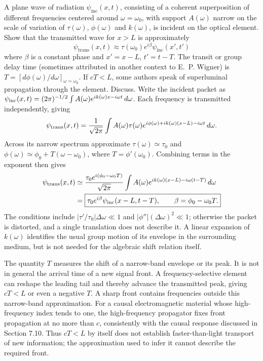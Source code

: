 A plane wave of radiation $\psi_{\mathrm{inc}}(x,t)$, consisting of a coherent superposition of different frequencies centered around $\omega=\omega_{0}$, with support $A(\omega)$ narrow on the scale of variation of $\tau(\omega)$, $\phi(\omega)$ and $k(\omega)$, is incident on the optical element. Show that the transmitted wave for $x>L$ is approximately
\[
\psi_{\mathrm{trans}}(x,t)\approx\tau(\omega_{0})e^{i\beta}\psi_{\mathrm{inc}}(x',t')
\]
where $\beta$ is a constant phase and $x'=x-L$, $t'=t-T$. The transit or group delay time (sometimes attributed in another context to E.~P. Wigner) is $T=[d\phi(\omega)/d\omega]_{\omega=\omega_{0}}$. If $cT<L$, some authors speak of superluminal propagation through the element. Discuss.
\solution
Write the incident packet as
$\psi_{\rm inc}(x,t)=(2\pi)^{-1/2}\int A(\omega)e^{ik(\omega)x-i\omega t}\,d\omega$.
Each frequency is transmitted independently, giving
\[
\psi_{\rm trans}(x,t)=\frac1{\sqrt{2\pi}}\int A(\omega)\tau(\omega)
 e^{i\phi(\omega)+ik(\omega)(x-L)-i\omega t}\,d\omega.
\]
Across its narrow spectrum approximate $\tau(\omega)\simeq\tau_0$
and $\phi(\omega)\simeq\phi_0+T(\omega-\omega_0)$, where
$T=\phi'(\omega_0)$. Combining terms in the exponent then gives
\begin{align*}
\psi_{\rm trans}(x,t)
&\simeq\frac{\tau_0 e^{i(\phi_0-\omega_0T)}}{\sqrt{2\pi}}
 \int A(\omega)e^{ik(\omega)(x-L)-i\omega(t-T)}\,d\omega\\
&=\boxed{\tau_0e^{i\beta}\psi_{\rm inc}(x-L,t-T),\qquad
\beta=\phi_0-\omega_0T.}
\end{align*}
The conditions include
$|\tau'/\tau_0|\Delta\omega\ll1$ and
$|\phi''|(\Delta\omega)^2\ll1$; otherwise the packet is distorted,
and a single translation does not describe it. A linear expansion
of $k(\omega)$ identifies the usual group motion of its envelope in
the surrounding medium, but is not needed for the algebraic shift
relation itself.

The quantity $T$ measures the shift of a narrow-band envelope or
its peak. It is not in general the arrival time of a new signal
front. A frequency-selective element can reshape the leading tail
and thereby advance the transmitted peak, giving $cT<L$ or even
a negative $T$. A sharp front contains frequencies outside this
narrow-band approximation. For a causal electromagnetic material
whose high-frequency index tends to one, the high-frequency
propagator fixes front propagation at no more than $c$, consistently
with the causal response discussed in Section 7.10. Thus $cT<L$
by itself does not establish faster-than-light transport of new
information; the approximation used to infer it cannot describe
the required front.


